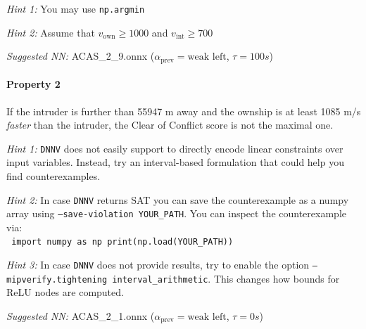 \documentclass[11pt,fleqn]{article}
\begin{document}
\textit{Hint 1:} You may use \texttt{np.argmin}

\textit{Hint 2:} Assume that $v_{\text{own}} \geq 1000$ and $v_{\text{int}} \geq 700$

\textit{Suggested NN:} ACAS\_2\_9.onnx ($\alpha_{\text{prev}}=\text{weak left}$, $\tau=100s$)




\paragraph*{Property 2}
If the intruder is further than 55947 m away and the ownship is at least 1085 m/s \emph{faster}
than the intruder, the Clear of Conflict score is not the maximal one.

\textit{Hint 1:}
\texttt{DNNV} does not easily support to directly encode linear constraints over input variables.
Instead, try an interval-based formulation that could help you find counterexamples.

\textit{Hint 2:}
In case \texttt{DNNV} returns SAT you can save the counterexample as a numpy array using \texttt{--save-violation YOUR\_PATH}.
You can inspect the counterexample via:\\
\texttt{
import numpy as np
print(np.load(YOUR\_PATH))
}

\textit{Hint 3:}
In case \texttt{DNNV} does not provide results, try to enable the option \texttt{--mipverify.tightening interval_arithmetic}.
This changes how bounds for $\mathrm{ReLU}$ nodes are computed.

\textit{Suggested NN:} ACAS\_2\_1.onnx ($\alpha_{\text{prev}}=\text{weak left}$, $\tau=0s$)

\end{document}
